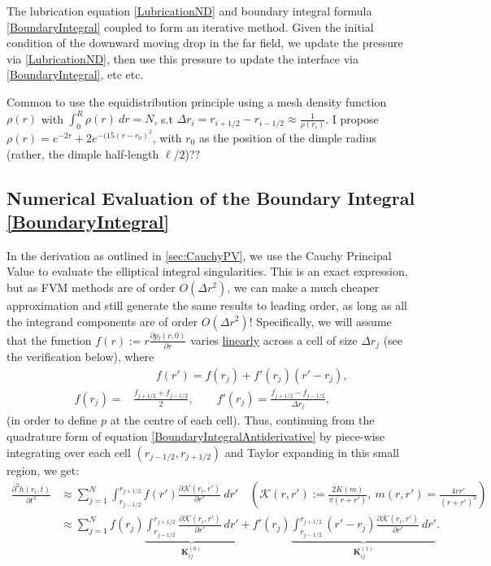 \documentclass[11pt,a4paper]{article}
\begin{document}
	The lubrication equation \eqref{LubricationND} and boundary integral formula \eqref{BoundaryIntegral} coupled to form an iterative method. Given the initial condition of the downward moving drop in the far field, we update the pressure via \eqref{LubricationND}, then use this pressure to update the interface via \eqref{BoundaryIntegral}, etc etc.
	
	Common to use the equidistribution principle using a mesh density function $\rho(r)$ with $\int^R_0 \rho(r) \ dr = N$, s.t $\Delta r_i = r_{i+1/2} - r_{i-1/2} \approx \frac{1}{\rho(r_i)}$. I propose $\rho(r) = e^{-2r} + 2e^{-(15(r-r_0)^2}$, with $r_0$ as the position of the dimple radius (rather, the dimple half-length $\ell/2$)??
	
	\subsection{Numerical Evaluation of the Boundary Integral \eqref{BoundaryIntegral}}
	In the derivation as outlined in \ref{sec:CauchyPV}, we use the Cauchy Principal Value to evaluate the elliptical integral singularities. This is an exact expression, but as FVM methods are of order $O(\Delta r^2)$, we can make a much cheaper approximation and still generate the same results to leading order, as long as all the integrand components are of order $O(\Delta r^2)$! Specifically, we will assume that the function $f(r) := r \frac{\partial p_l(r,0)}{\partial r}$ varies \underline{linearly} across a cell of size $\Delta r_j$ (see the verification below), where
	\begin{subequations}
		\label{fFVMDefinition}
		\begin{align}
			& \qquad f(r') = f(r_j) + f'(r_j)(r' - r_j), \label{fFVMDefinition:1} \\[6pt]
			f(r_j) = &\frac{f_{j+1/2} + f_{j-1/2}}{2}, \qquad f'(r_j) = \frac{f_{j+1/2} - f_{j-1/2}}{\Delta r_j},  \label{fFVMDefinition:2}
		\end{align}
	\end{subequations}
	(in order to define $p$ at the centre of each cell). Thus, continuing from the quadrature form of equation \eqref{BoundaryIntegralAntiderivative} by piece-wise integrating over each cell $(r_{j-1/2}, r_{j+1/2})$ and Taylor expanding in this small region, we get:
	\begin{equation}
		\label{BIAQuad}
		\begin{aligned}
			\frac{\partial^2 h(r_i,t)}{\partial t^2} &\approx \sum^N_{j = 1} \int^{r_{j+1/2}}_{r_{j-1/2}} f(r') \frac{\partial \mathcal{K}(r_i, r')}{\partial r'}\ dr'\quad \left( \mathcal{K}(r, r') := \frac{2K(m)}{\pi(r+r')},\ m(r,r') = \frac{4rr'}{(r+r')^2} \right) \\
			&\approx \sum^N_{j = 1} f(r_j) \underbrace{\int^{r_{j+1/2}}_{r_{j-1/2}} \frac{\partial \mathcal{K}(r_i, r')}{\partial r'}\ dr'}_{\mathbf{K}^{(0)}_{ij}} + f'(r_j) \underbrace{\int^{r_{j+1/2}}_{r_{j-1/2}}  (r'-r_j)\frac{\partial \mathcal{K}(r_i, r')}{\partial r'}\ dr'}_{\mathbf{K}^{(1)}_{ij}}.
		\end{aligned}
	\end{equation}
\end{document}
